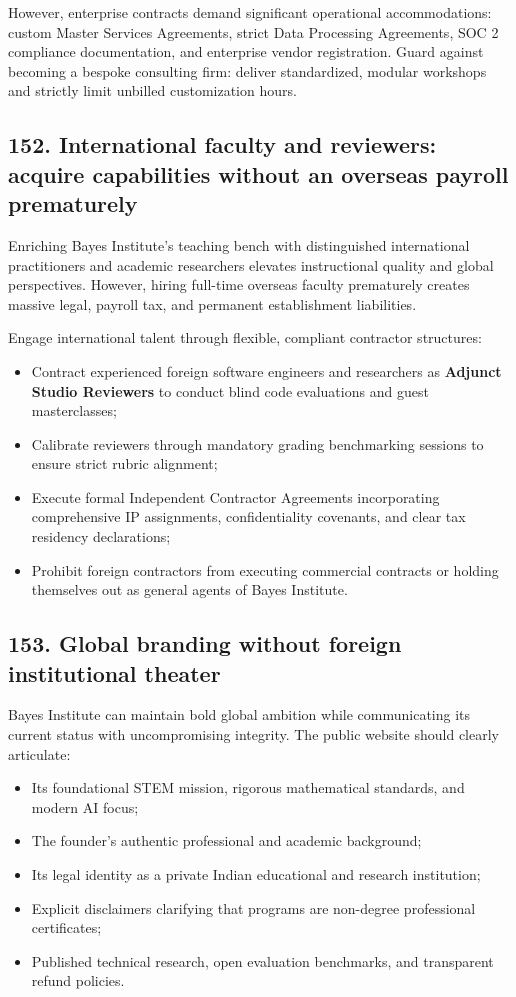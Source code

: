 However, enterprise contracts demand significant operational accommodations: custom Master Services Agreements, strict Data Processing Agreements, SOC 2 compliance documentation, and enterprise vendor registration. Guard against becoming a bespoke consulting firm: deliver standardized, modular workshops and strictly limit unbilled customization hours.

\subsection{152. International faculty and reviewers: acquire capabilities without an overseas payroll prematurely}

Enriching Bayes Institute's teaching bench with distinguished international practitioners and academic researchers elevates instructional quality and global perspectives. However, hiring full-time overseas faculty prematurely creates massive legal, payroll tax, and permanent establishment liabilities.

Engage international talent through flexible, compliant contractor structures:
\begin{itemize}
    \item Contract experienced foreign software engineers and researchers as \textbf{Adjunct Studio Reviewers} to conduct blind code evaluations and guest masterclasses;
    \item Calibrate reviewers through mandatory grading benchmarking sessions to ensure strict rubric alignment;
    \item Execute formal Independent Contractor Agreements incorporating comprehensive IP assignments, confidentiality covenants, and clear tax residency declarations;
    \item Prohibit foreign contractors from executing commercial contracts or holding themselves out as general agents of Bayes Institute.
\end{itemize}

\subsection{153. Global branding without foreign institutional theater}

Bayes Institute can maintain bold global ambition while communicating its current status with uncompromising integrity. The public website should clearly articulate:
\begin{itemize}
    \item Its foundational STEM mission, rigorous mathematical standards, and modern AI focus;
    \item The founder's authentic professional and academic background;
    \item Its legal identity as a private Indian educational and research institution;
    \item Explicit disclaimers clarifying that programs are non-degree professional certificates;
    \item Published technical research, open evaluation benchmarks, and transparent refund policies.
\end{itemize}

